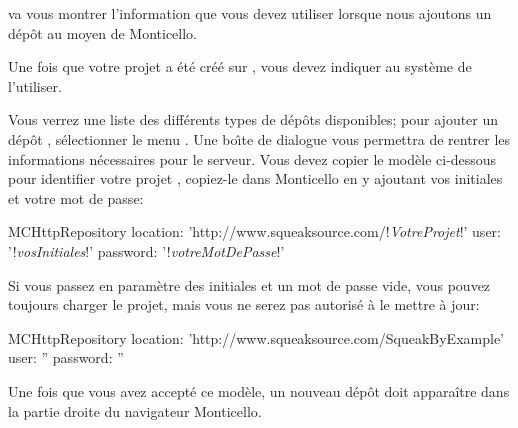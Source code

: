 \documentclass[a4paper,10pt,twoside]{book}
\begin{document}
\sqsrc va vous montrer l'information que vous devez utiliser
lorsque nous ajoutons un dépôt au moyen de Monticello.

Une fois que votre projet a été créé sur \sqsrc, vous devez indiquer au système \pharo de l'utiliser.

  Vous
verrez une liste des différents types de dépôts disponibles; pour
ajouter un dépôt \sqsrc, sélectionner le menu . Une
bo\^{\i}te de dialogue vous permettra de rentrer les informations
nécessaires pour le serveur.
Vous devez copier le modèle ci-dessous pour identifier votre projet
\sqsrc, copiez-le dans Monticello en y ajoutant vos initiales
et votre mot de passe:

\begin{code}{}
MCHttpRepository 
    location: 'http://www.squeaksource.com/!\emph{VotreProjet}!'
    user: '!\emph{vosInitiales}!' 
    password: '!\emph{votreMotDePasse}!'
\end{code}   

\noindent
Si vous passez en paramètre des initiales et un mot de passe vide,
vous pouvez toujours charger le projet, mais vous ne serez pas
autorisé à le mettre à jour:

\begin{code}{}
MCHttpRepository 
    location: 'http://www.squeaksource.com/SqueakByExample'
    user: '' 
    password: ''
\end{code}   

Une fois que vous avez accepté ce modèle, un nouveau dépôt doit
apparaître dans la partie droite du navigateur Monticello.
\end{document}
